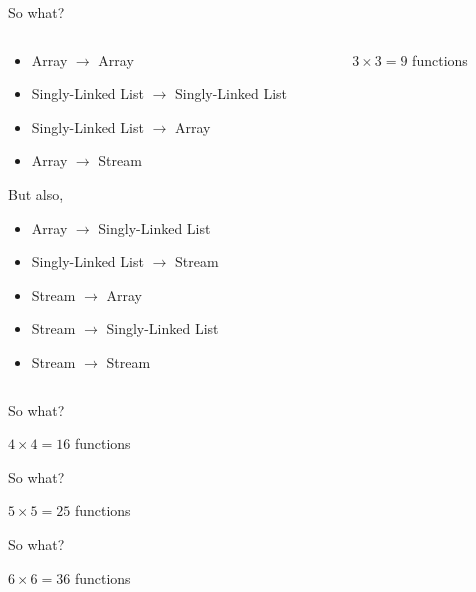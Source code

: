 \documentclass[aspectratio=169]{beamer}
\begin{document}
\begin{frame}{So what?}
  \begin{columns}
    \begin{column}{0.65\textwidth}
      \begin{itemize}
      \item Array $\to$ Array
      \item Singly-Linked List $\to$ Singly-Linked List
      \item Singly-Linked List $\to$ Array
      \item Array $\to$ Stream
      \end{itemize}
      \pause{}
      But also,
      \begin{itemize}
      \item Array $\to$ Singly-Linked List
      \item Singly-Linked List $\to$ Stream
      \item Stream $\to$ Array
      \item Stream $\to$ Singly-Linked List
      \item Stream $\to$ Stream
      \end{itemize}
    \end{column}
    \begin{column}{0.35\textwidth}
      \Large$3 \times 3 = 9$ functions
    \end{column}
  \end{columns}
\end{frame}


\begin{frame}{So what?}
  \begin{center}
    \Large$4 \times 4 = 16$ functions
  \end{center}
\end{frame}


\begin{frame}{So what?}
  \begin{center}
    \Large$5 \times 5 = 25$ functions
  \end{center}
\end{frame}


\begin{frame}{So what?}
  \begin{center}
    \Large$6 \times 6 = 36$ functions
  \end{center}
\end{frame}
\end{document}
